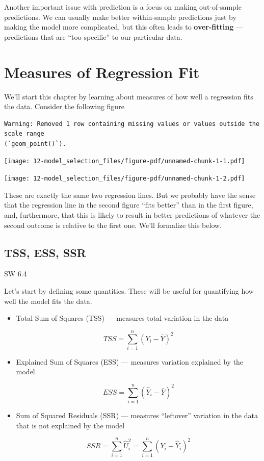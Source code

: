 \documentclass[
  letterpaper,
  DIV=11,
  numbers=noendperiod]{scrreprt}
\begin{document}
Another important issue with prediction is a focus on making
out-of-sample predictions. We can usually make better within-sample
predictions just by making the model more complicated, but this often
leads to \textbf{over-fitting} --- predictions that are ``too specific''
to our particular data.

\section{Measures of Regression Fit}\label{measures-of-regression-fit}

We'll start this chapter by learning about measures of how well a
regression fits the data. Consider the following figure

\begin{verbatim}
Warning: Removed 1 row containing missing values or values outside the scale range
(`geom_point()`).
\end{verbatim}

\begin{center}
\texttt{[image: 12-model\_selection\_files/figure-pdf/unnamed-chunk-1-1.pdf]}
\end{center}

\begin{center}
\texttt{[image: 12-model\_selection\_files/figure-pdf/unnamed-chunk-1-2.pdf]}
\end{center}

These are exactly the same two regression lines. But we probably have
the sense that the regression line in the second figure ``fits better''
than in the first figure, and, furthermore, that this is likely to
result in better predictions of whatever the second outcome is relative
to the first one. We'll formalize this below.

\subsection{TSS, ESS, SSR}\label{tss-ess-ssr}

SW 6.4

Let's start by defining some quantities. These will be useful for
quantifying how well the model fits the data.

\begin{itemize}
\item
  Total Sum of Squares (TSS) --- measures total variation in the data

  \[
      TSS = \sum_{i=1}^n (Y_i - \bar{Y})^2
    \]
\item
  Explained Sum of Squares (ESS) --- measures variation explained by the
  model

  \[
      ESS = \sum_{i=1}^n (\hat{Y}_i - \bar{Y})^2
    \]
\item
  Sum of Squared Residuals (SSR) --- measures ``leftover'' variation in
  the data that is not explained by the model

  \[
      SSR = \sum_{i=1}^n \hat{U}_i^2 = \sum_{i=1}^n (Y_i - \hat{Y}_i)^2
    \]
\end{itemize}
\end{document}
